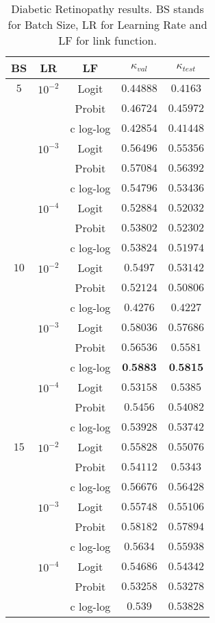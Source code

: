 \documentclass[10pt, a4paper, titlepage, twocolumn]{article}
\begin{document}
	\begin{table}[htbp]
		\footnotesize
		\centering
		\begin{tabular}{ccc|cc}
			BS & LR & LF & $\kappa_{val}$ & $\kappa_{test}$\\\hline\addlinespace[0.05cm]
			$5$ & $10^{-2}$ & Logit & $0.44888$ & $0.4163$\\
			& & Probit & $0.46724$ & $0.45972$\\
			& & c log-log & $0.42854$ & $0.41448$\\
			& $10^{-3}$ & Logit & $0.56496$ & $0.55356$\\
			& & Probit & $0.57084$ & $0.56392$\\
			& & c log-log & $0.54796$ & $0.53436$\\
			& $10^{-4}$ & Logit & $0.52884$ & $0.52032$\\
			& & Probit & $0.53802$ & $0.52302$\\
			& & c log-log & $0.53824$ & $0.51974$\\
			$10$ & $10^{-2}$ & Logit & $0.5497$ & $0.53142$\\
			& & Probit & $0.52124$ & $0.50806$\\
			& & c log-log & $0.4276$ & $0.4227$\\
			& $10^{-3}$ & Logit & $0.58036$ & $0.57686$\\
			& & Probit & $0.56536$ & $0.5581$\\
			& & c log-log & $\textbf{0.5883}$ & $\textbf{0.5815}$\\
			& $10^{-4}$ & Logit & $0.53158$ & $0.5385$\\
			& & Probit & $0.5456$ & $0.54082$\\
			& & c log-log & $0.53928$ & $0.53742$\\
			$15$ & $10^{-2}$ & Logit & $0.55828$ & $0.55076$\\
			& & Probit & $0.54112$ & $0.5343$\\
			& & c log-log & $0.56676$ & $0.56428$\\
			& $10^{-3}$ & Logit & $0.55748$ & $0.55106$\\
			& & Probit & $0.58182$ & $0.57894$\\
			& & c log-log & $0.5634$ & $0.55938$\\
			& $10^{-4}$ & Logit & $0.54686$ & $0.54342$\\
			& & Probit & $0.53258$ & $0.53278$\\
			& & c log-log & $0.539$ & $0.53828$
		\end{tabular}
		\caption{Diabetic Retinopathy results. BS stands for Batch Size, LR for Learning Rate and LF for link function.}
		\label{table:DRresults}
	\end{table}
	
\end{document}
